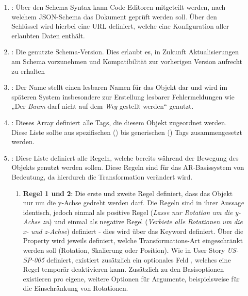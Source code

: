 \begin{enumerate}
    \item {}: Über den Schema-Syntax kann Code-Editoren mitgeteilt werden, nach welchem JSON-Schema das Dokument geprüft werden soll. Über den Schlüssel wird hierbei eine URL definiert, welche eine Konfiguration aller erlaubten Daten enthält.
    \item {}: Die genutzte Schema-Version. Dies erlaubt es, in Zukunft Aktualisierungen am Schema vorzunehmen und Kompatibilität zur vorherigen Version aufrecht zu erhalten
    \item {}: Der Name stellt einen lesbaren Namen für das Objekt dar und wird im späteren System insbesondere zur Erstellung lesbarer Fehlermeldungen wie „Der \textit{Baum} darf nicht auf dem \textit{Weg} gestellt werden“ genutzt.
    \item {}: Dieses Array definiert alle Tags, die diesem Objekt zugeordnet werden. Diese Liste sollte aus spezifischen () bis generischen () Tags zusammengesetzt werden.
    \item {}: Diese Liste definiert alle Regeln, welche bereits während der Bewegung des Objekts genutzt werden sollen. Diese Regeln sind für das AR-Basissystem von Bedeutung, da hierdurch die Transformation verändert wird.
    \begin{enumerate}
        \item \textbf{Regel 1 und 2}: Die erste und zweite Regel definiert, dass das Objekt nur um die y-Achse gedreht werden darf. Die Regeln sind in ihrer Aussage identisch, jedoch einmal als positive Regel (\textit{Lasse nur Rotation um die y-Achse zu}) und einmal als negative Regel (\textit{Verbiete alle Rotationen um die x- und z-Achse}) definiert - dies wird über das Keyword  definiert.
        Über die Property  wird jeweils definiert, welche Transformations-Art eingeschränkt werden soll (Rotation, Skalierung oder Position). 
        Wie in User Story \textit{US-SP-005} definiert, existiert zusätzlich ein optionales Feld , welches eine Regel temporär deaktivieren kann.
        Zusätzlich zu den Basisoptionen existieren pro  eigene, weitere Optionen für Argumente, beispielsweise  für die Einschränkung von Rotationen. 
        

\end{enumerate}
\end{enumerate}
